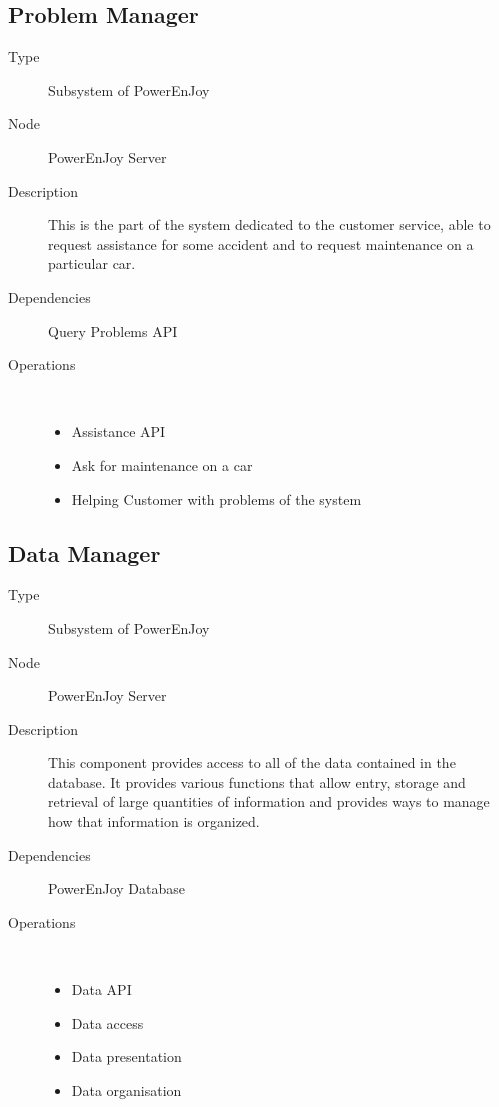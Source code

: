 \subsection{Problem Manager}
\begin{description}
	\item[Type] Subsystem of PowerEnJoy
	\item[Node] PowerEnJoy Server
	\item[Description] This is the part of the system dedicated to the customer service, able to request assistance for some accident and to request maintenance on a particular car.
	\item[Dependencies] Query Problems API
	\item[Operations] \ \\
		\begin{itemize}
			\item Assistance API
			\item Ask for maintenance on a car
			\item Helping Customer with problems of the system
	\end{itemize}
\end{description}

\subsection{Data Manager}
\begin{description}
	\item[Type] Subsystem of PowerEnJoy
	\item[Node] PowerEnJoy Server
	\item[Description] This component provides access to all of the data contained in the database. It provides various functions that allow entry, storage and retrieval of large quantities of information and provides ways to manage how that information is organized.
	\item[Dependencies] PowerEnJoy Database
	\item[Operations] \ \\
		\begin{itemize}
			\item Data API
			\item Data access
			\item Data presentation 
			\item Data organisation
		\end{itemize}
\end{description}
\newpage